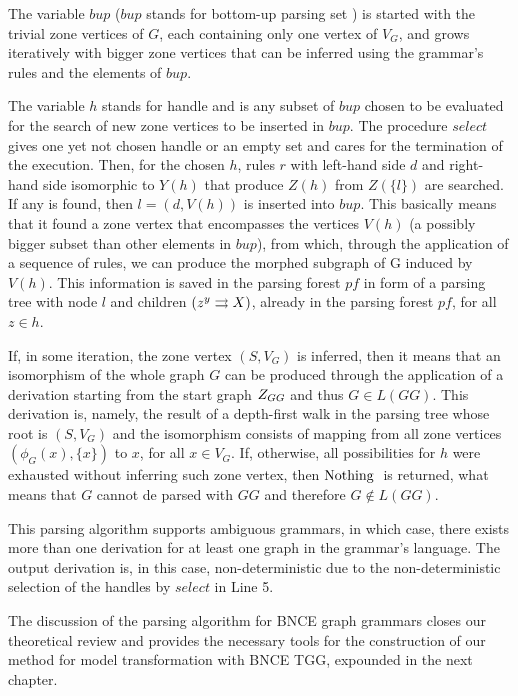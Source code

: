 The variable $bup$ ($bup$ stands for bottom-up parsing set \cite{rozenberg1986boundary}) is started with the trivial zone vertices of $G$, each containing only one vertex of $V_G$, and grows iteratively with bigger zone vertices that can be inferred using the grammar's rules and the elements of $bup$.

The variable $h$ stands for handle and is any subset of $bup$ chosen to be evaluated for the search of new zone vertices to be inserted in $bup$. The procedure $select$ gives one yet not chosen handle or an empty set and cares for the termination of the execution. Then, for the chosen $h$, rules $r$ with left-hand side $d$ and right-hand side isomorphic to $Y(h)$ that produce $Z(h)$ from $Z(\{l\})$ are searched. If any is found, then $l = (d,V(h))$ is inserted into $bup$. This basically means that it found a zone vertex that encompasses the vertices $V(h)$ (a possibly bigger subset than other elements in $bup$), from which, through the application of a sequence of rules, we can produce the morphed subgraph of G induced by $V(h)$. This information is saved in the parsing forest $pf$ in form of a parsing tree with node $l$ and children $\ptree{z}{y}{X}$, already in the parsing forest $pf$, for all $z \in h$.

If, in some iteration, the zone vertex $(S, V_G)$ is inferred, then it means that an isomorphism of the whole graph $G$ can be produced through the application of a derivation starting from the start graph $Z_{GG}$ and thus $G \in L(GG)$. This derivation is, namely, the result of a depth-first walk in the parsing tree whose root is $(S, V_G)$ and the isomorphism consists of mapping from all zone vertices $(\phi_G(x),\{x\})$ to $x$, for all $x \in V_G$. If, otherwise, all possibilities for $h$ were exhausted without inferring such zone vertex, then $\operatorname{\text{Nothing}}\;$ is returned, what means that $G$ cannot de parsed with $GG$ and therefore $G \notin L(GG)$.

This parsing algorithm supports ambiguous grammars, in which case, there exists more than one derivation for at least one graph in the grammar's language. The output derivation is, in this case, non-deterministic due to the non-deterministic selection of the handles by $select$ in Line 5.

The discussion of the parsing algorithm for BNCE graph grammars closes our theoretical review and provides the necessary tools for the construction of our method for model transformation with BNCE TGG, expounded in the next chapter.